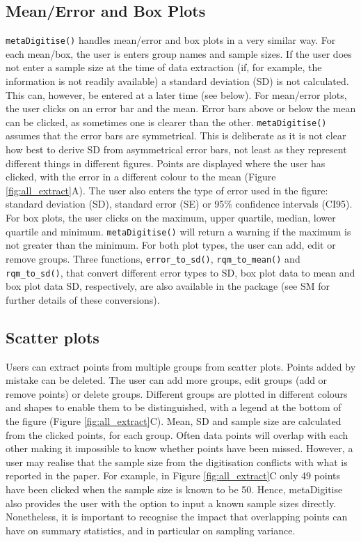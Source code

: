 \documentclass[12pt]{article}
\newcommand{\fct}[1]{\texttt{#1()}}
\newcommand{\pkg}[1]{{\fontseries{b}\selectfont #1}}
\begin{document}
\subsection{Mean/Error and Box Plots} 
\fct{metaDigitise} handles mean/error and box plots in a very similar way. For each mean/box, the user is enters group names and sample sizes. If the user does not enter a sample size at the time of data extraction (if, for example, the information is not readily available) a standard deviation (SD) is not calculated. This can, however, be entered at a later time (see below). For mean/error plots, the user clicks on an error bar and the mean. Error bars above or below the mean can be clicked, as sometimes one is clearer than the other. \fct{metaDigitise} assumes that the error bars are symmetrical. This is deliberate as it is not clear how best to derive SD from asymmetrical error bars, not least as they represent different things in different figures. Points are displayed where the user has clicked, with the error in a different colour to the mean (Figure \ref{fig:all_extract}A). The user also enters the type of error used in the figure: standard deviation (SD), standard error (SE) or 95\% confidence intervals (CI95). For box plots, the user clicks on the maximum, upper quartile, median, lower quartile and minimum. \fct{metaDigitise} will return a warning if the maximum is not greater than the minimum. For both plot types, the user can add, edit or remove groups. Three functions, \fct{error\_to\_sd}, \fct{rqm\_to\_mean} and \fct{rqm\_to\_sd}, that convert different error types to SD, box plot data to mean and box plot data SD, respectively, are also available in the package (see SM for further details of these conversions).


\subsection{Scatter plots}
Users can extract points from multiple groups from scatter plots. Points added by mistake can be deleted. The user can add more groups, edit groups (add or remove points) or delete groups. Different groups are plotted in different colours and shapes to enable them to be distinguished, with a legend at the bottom of the figure (Figure \ref{fig:all_extract}C). Mean, SD and sample size are calculated from the clicked points, for each group. Often data points will overlap with each other making it impossible to know whether points have been missed. However, a user may realise that the sample size from the digitisation conflicts with what is reported in the paper. For example, in Figure \ref{fig:all_extract}C only 49 points have been clicked when the sample size is known to be 50. Hence, \pkg{metaDigitise} also provides the user with the option to input a known sample sizes directly. Nonetheless, it is important to recognise the impact that overlapping points can have on summary statistics, and in particular on sampling variance.
\end{document}

